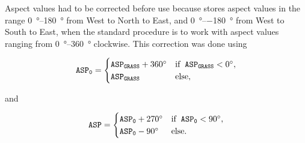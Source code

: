 %   
%   
%   
%   

Aspect values had to be corrected before use because  stores aspect values in the range 
\SIrange{0}{+180}{\degree} from West to North to East, and \SIrange{0}{-180}{\degree} from West to South to 
East, when the standard procedure is to work with aspect values ranging from \SIrange{0}{360}{\degree} 
clockwise. This correction was done using

\begin{equation}
 \tt{ASP}_{0} =
 \begin{cases}
  \tt{ASP}_{GRASS} + \ang{360} & \text{if}\;\; \tt{ASP}_{GRASS} < \ang{0}, \\
  \tt{ASP}_{GRASS}             & \text{else},
 \end{cases}
\end{equation}

\noindent and

\begin{equation}
 \tt{ASP} =
 \begin{cases}
  \tt{ASP}_{0} + \ang{270} & \text{if}\;\; \tt{ASP}_{0} < \ang{90}, \\
  \tt{ASP}_{0} - \ang{90}  & \text{else}.
 \end{cases}
\end{equation}

